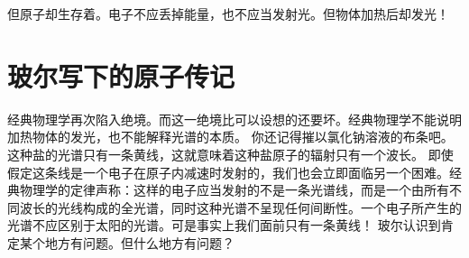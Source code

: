 但原子却生存着。电子不应丢掉能量，也不应当发射光。但物体加热后却发光！

\section{玻尔写下的原子传记}

经典物理学再次陷入绝境。而这一绝境比可以设想的还要坏。经典物理学不能说明加热物体的发光，也不能解释光谱的本质。
你还记得摧以氯化钠溶液的布条吧。这种盐的光谱只有一条黄线，这就意味着这种盐原子的辐射只有一个波长。
即使假定这条线是一个电子在原子内减速时发射的，我们也会立即面临另一个困难。经典物理学的定律声称：这样的电子应当发射的不是一条光谱线，而是一个由所有不同波长的光线构成的全光谱，同时这种光谱不呈现任何间断性。一个电子所产生的光谱不应区别于太阳的光谱。可是事实上我们面前只有一条黄线！
玻尔认识到肯定某个地方有问题。但什么地方有问题？

